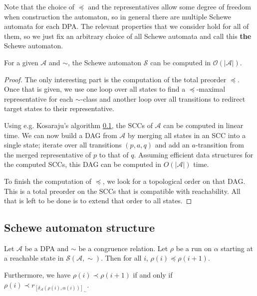 Note that the choice of $\preceq$ and the representatives allow some degree of freedom when construction the automaton, so in general there are multiple Schewe automata for each DPA. The relevant properties that we consider hold for all of them, so we just fix an arbitrary choice of all Schewe automata and call this \textbf{the} Schewe automaton.

\begin{lem}
\label{lem:schewe:schewe_aut_linear_time}
	For a given $\mathcal{A}$ and $\sim$, the Schewe automaton $\mathcal{S}$ can be computed in $\mathcal{O}(|\mathcal{A}|)$.
\end{lem}

\begin{proof}
	The only interesting part is the computation of the total preorder $\preceq$. Once that is given, we use one loop over all states to find a $\preceq$-maximal representative for each $\sim$-class and another loop over all transitions to redirect target states to their representative.

	Using e.g. Kosaraju's algorithm \ref{}, the SCCs of $\mathcal{A}$ can be computed in linear time. We can now build a DAG from $\mathcal{A}$ by merging all states in an SCC into a single state; iterate over all transitions $(p, a, q)$ and add an $a$-transition from the merged representative of $p$ to that of $q$. Assuming efficient data structures for the computed SCCs, this DAG can be computed in $O(|\mathcal{A}|)$ time.
	
	To finish the computation of $\preceq$, we look for a topological order on that DAG. This is a total preorder on the SCCs that is compatible with reachability. All that is left to be done is to extend that order to all states.
\end{proof}




\vspace{1cm}

\subsection{Schewe automaton structure}

\begin{lem}
\label{lem:schewe:run_growing}
	Let $\mathcal{A}$ be a DPA and $\sim$ be a congruence relation. Let $\rho$ be a run on $\alpha$ starting at a reachable state in $\mathcal{S}(\mathcal{A}, \sim)$. Then for all $i$, $\rho(i) \preceq \rho(i+1)$.
	
	Furthermore, we have $\rho(i) \prec \rho(i+1)$ if and only if $\rho(i) \prec r_{[\delta_\mathcal{A}(\rho(i), \alpha(i))]_\sim}$.
\end{lem}


